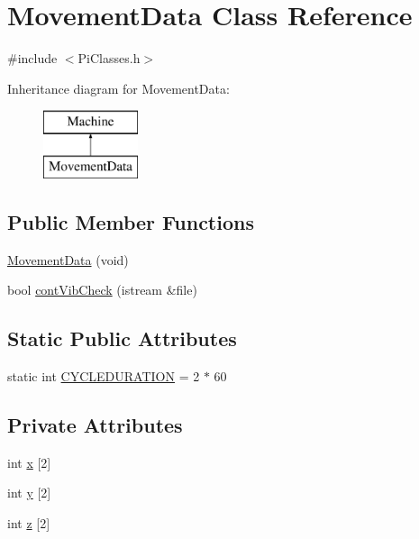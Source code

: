 \hypertarget{classMovementData}{}\section{Movement\+Data Class Reference}
\label{classMovementData}


{\ttfamily \#include $<$Pi\+Classes.\+h$>$}

Inheritance diagram for Movement\+Data\+:\begin{figure}[H]
\begin{center}
\leavevmode
\includegraphics[height=2.000000cm]{classMovementData}
\end{center}
\end{figure}
\subsection*{Public Member Functions}
\begin{DoxyCompactItemize}
\item 
\hyperlink{classMovementData_a0592d4c39f84928dfa2a27aba5851aaf}{Movement\+Data} (void)
\item 
bool \hyperlink{classMovementData_a0460eb813078fc9e9eef646bb495a8a3}{cont\+Vib\+Check} (istream \&file)
\end{DoxyCompactItemize}
\subsection*{Static Public Attributes}
\begin{DoxyCompactItemize}
\item 
static int \hyperlink{classMovementData_abd2ebde61b24ecee8634bc0ad5a9d79c}{C\+Y\+C\+L\+E\+D\+U\+R\+A\+T\+I\+O\+N} = 2 $\ast$ 60
\end{DoxyCompactItemize}
\subsection*{Private Attributes}
\begin{DoxyCompactItemize}
\item 
int \hyperlink{classMovementData_a8bd69fc477e461a1adee4cfa8762817b}{x} \mbox{[}2\mbox{]}
\item 
int \hyperlink{classMovementData_afefc24b91fda0633c33b916eb70a9177}{y} \mbox{[}2\mbox{]}
\item 
int \hyperlink{classMovementData_a319111ec5eb9f0adc4eda7e177e8eccd}{z} \mbox{[}2\mbox{]}
\end{DoxyCompactItemize}
